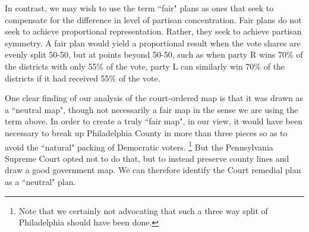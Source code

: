 \par
    In contrast, we may wish to use the term ``fair" plans as ones that seek to compensate for the difference in level of partisan concentration. Fair plans do not seek to achieve proportional representation. Rather, they seek to achieve partisan symmetry. A fair plan would yield a proportional result when the vote shares are evenly split 50-50, but at points beyond 50-50, such as when party R wins 70\% of the districts with only 55\% of the vote, party L can similarly win 70\% of the districts if it had received 55\% of the vote. 
\par
    One clear finding of our analysis of the court-ordered map is that it was drawn as a ``neutral map", though not necessarily a fair map in the sense we are using the term above. In order to create a truly ``fair map", in our view, it would have been necessary to break up Philadelphia County in more than three pieces so as to avoid the ``natural" packing of Democratic voters.
    \footnote{Note that we certainly not advocating that such a three way split of Philadelphia should have been done.}
    But the Pennsylvania Supreme Court opted not to do that, but to instead preserve county lines and draw a good government map. We can therefore identify the Court remedial plan as a ``neutral" plan.
  \par
  \par

%

